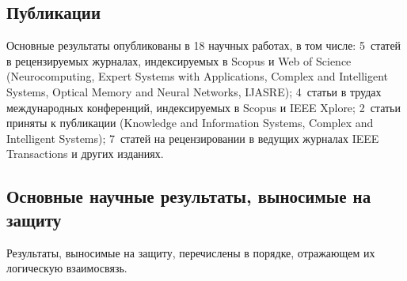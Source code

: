 \documentclass[12pt,a5paper]{article}
\begin{document}
\subsection*{Публикации}

Основные результаты опубликованы в 18 научных работах, в том числе: 5~статей в рецензируемых журналах, индексируемых в Scopus и Web of Science (Neurocomputing, Expert Systems with Applications, Complex and Intelligent Systems, Optical Memory and Neural Networks, IJASRE); 4~статьи в трудах международных конференций, индексируемых в Scopus и IEEE Xplore; 2~статьи приняты к публикации (Knowledge and Information Systems, Complex and Intelligent Systems); 7~статей на рецензировании в ведущих журналах IEEE Transactions и других изданиях.

\subsection*{Основные научные результаты, выносимые на защиту}

Результаты, выносимые на защиту, перечислены в порядке, отражающем их логическую взаимосвязь.
\end{document}
